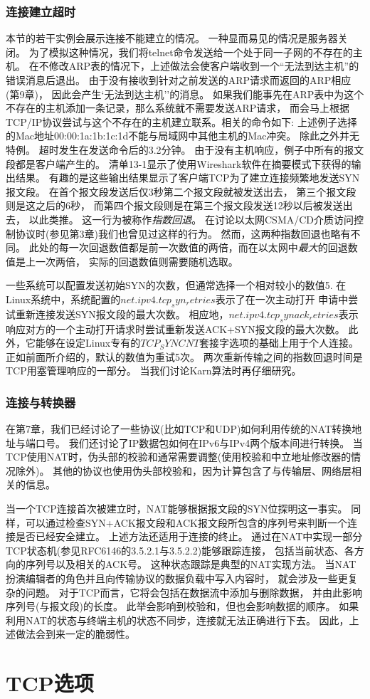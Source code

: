 \documentclass{../main.tex}{subfiles}
\begin{document}
\subsubsection{连接建立超时}
本节的若干实例会展示连接不能建立的情况。
一种显而易见的情况是服务器关闭。
为了模拟这种情况，我们将telnet命令发送给一个处于同一子网的不存在的主机。
在不修改ARP表的情况下，上述做法会使客户端收到一个``无法到达主机''的错误消息后退出。
由于没有接收到针对之前发送的ARP请求而返回的ARP相应(第9章)，
    因此会产生`无法到达主机''的消息。
如果我们能事先在ARP表中为这个不存在的主机添加一条记录，那么系统就不需要发送ARP请求，
而会马上根据TCP/IP协议尝试与这个不存在的主机建立联系。相关的命令如下: 
上述例子选择的Mac地址00:00:1a:1b:1c:1d不能与局域网中其他主机的Mac冲突。
除此之外并无特例。
超时发生在发送命令后的3.2分钟。
由于没有主机响应，例子中所有的报文段都是客户端产生的。
清单13-1显示了使用Wireshark软件在摘要模式下获得的输出结果。
有趣的是这些输出结果显示了客户端TCP为了建立连接频繁地发送SYN报文段。
在首个报文段发送后仅3秒第二个报文段就被发送出去，
    第三个报文段则是这之后的6秒，
    而第四个报文段则是在第三个报文段发送12秒以后被发送出去，
    以此类推。
这一行为被称作\emph{指数回退}。
在讨论以太网CSMA/CD介质访问控制协议时(参见第3章)我们也曾见过这样的行为。
然而，这两种指数回退也略有不同。
此处的每一次回退数值都是前一次数值的两倍，而在以太网中\emph{最大}的回退数值是上一次两倍，
    实际的回退数值则需要随机选取。

一些系统可以配置发送初始SYN的次数，但通常选择一个相对较小的数值5.
在Linux系统中，系统配置的$net.ipv4.tcp_syn_retries$表示了在一次主动打开
    申请中尝试重新连接发送SYN报文段的最大次数。
相应地，$net.ipv4.tcp_synack_retries$表示响应对方的一个主动打开请求时尝试重新发送ACK+SYN报文段的最大次数。
此外，它能够在设定Linux专有的$TCP_SYNCNT$套接字选项的基础上用于个人连接。
正如前面所介绍的，默认的数值为重试5次。
两次重新传输之间的指数回退时间是TCP用塞管理响应的一部分。
当我们讨论Karn算法时再仔细研究。


\subsubsection{连接与转换器}
在第7章，我们已经讨论了一些协议(比如TCP和UDP)如何利用传统的NAT转换地址与端口号。
我们还讨论了IP数据包如何在IPv6与IPv4两个版本间进行转换。
当TCP使用NAT时，伪头部的校验和通常需要调整(使用校验和中立地址修改器的情况除外)。
其他的协议也使用伪头部校验和，因为计算包含了与传输层、网络层相关的信息。

当一个TCP连接首次被建立时，NAT能够根据报文段的SYN位探明这一事实。
同样，可以通过检查SYN+ACK报文段和ACK报文段所包含的序列号来判断一个连接是否已经安全建立。
上述方法还适用于连接的终止。
通过在NAT中实现一部分TCP状态机(参见RFC6146的3.5.2.1与3.5.2.2)能够跟踪连接，
    包括当前状态、各方向的序列号以及相关的ACK号。
这种状态跟踪是典型的NAT实现方法。
当NAT扮演编辑者的角色并且向传输协议的数据负载中写入内容时，
就会涉及一些更复杂的问题。
对于TCP而言，它将会包括在数据流中添加与删除数据，
并由此影响序列号(与报文段)的长度。
此举会影响到校验和，但也会影响数据的顺序。
如果利用NAT的状态与终端主机的状态不同步，连接就无法正确进行下去。
因此，上述做法会到来一定的脆弱性。


\section{TCP选项}
\end{document}

